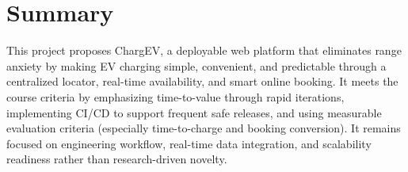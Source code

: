 \documentclass[11pt,a4paper]{article}
\begin{document}
\section{Summary}
This project proposes ChargEV, a deployable web platform
that eliminates range anxiety by making EV charging
simple, convenient, and predictable through a centralized
locator, real-time availability, and smart online booking.
It meets the course criteria by emphasizing time-to-value
through rapid iterations, implementing CI/CD to support
frequent safe releases, and using measurable evaluation
criteria (especially time-to-charge and booking conversion).
It remains focused on engineering workflow, real-time data
integration, and scalability readiness rather than
research-driven novelty.
\end{document}
